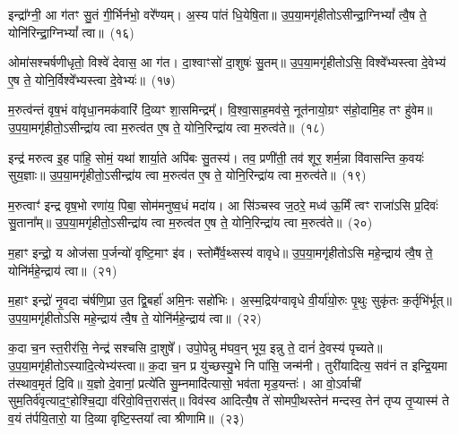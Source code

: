 {\anuvakamend[{मधु॑स्त्रि॒ꣳ॒शत्}]}%

इन्द्रा᳚ग्नी॒ आ ग॑तꣳ सु॒तं गी॒र्भिर्नभो॒ वरे᳚ण्यम्। अ॒स्य पा॑तं धि॒येषि॒ता॥ उ॒प॒या॒मगृ॑हीतो\-ऽसीन्द्रा॒ग्नि\-भ्यां᳚ त्वै॒ष ते॒ योनि॑रिन्द्रा॒ग्नि\-भ्यां᳚ त्वा॥~(१६)\ip

{\anuvakamend[{इन्द्रा᳚ग्नी विꣳश॒तिः}]}%

ओमा॑सश्चर्\mbox{}षणीधृतो॒ विश्वे॑ देवास॒ आ ग॑त। दा॒श्वाꣳसो॑ दा॒शुषः॑ सु॒तम्॥ उ॒प॒या॒मगृ॑हीतो\-ऽसि॒ विश्वे᳚भ्यस्त्वा दे॒वेभ्य॑ ए॒ष ते॒ योनि॒र्विश्वे᳚भ्यस्त्वा दे॒वेभ्यः॑॥~(१७)\ip

{\anuvakamend[{इन्द्रा᳚ग्नी॒ ओमा॑सो विꣳश॒तिर्विꣳ॑शतिः}]}%

म॒रुत्व॑न्तं वृष॒भं वा॑वृधा॒नमक॑वारिं दि॒व्यꣳ शा॒समिन्द्रम्᳚। वि॒श्वा॒साह॒मव॑से॒ नूत॑नायो॒ग्रꣳ स॑हो॒दामि॒ह तꣳ हु॑वेम॥ उ॒प॒या॒मगृ॑हीतो॒\-ऽसीन्द्रा॑य त्वा म॒रुत्व॑त ए॒ष ते॒ योनि॒रिन्द्रा॑य त्वा म॒रुत्व॑ते॥~(१८)\ip

{\anuvakamend[{म॒रुत्व॑न्त॒ꣳ॒ षड्विꣳ॑शतिः}]}%

इन्द्र॑ मरुत्व इ॒ह पा॑हि॒ सोमं॒ यथा॑ शार्या॒ते अपि॑बः सु॒तस्य॑। तव॒ प्रणी॑ती॒ तव॑ शूर॒ शर्म॒न्ना वि॑वासन्ति क॒वयः॑ सुय॒ज्ञाः॥ उ॒प॒या॒मगृ॑हीतो॒\-ऽसीन्द्रा॑य त्वा म॒रुत्व॑त ए॒ष ते॒ योनि॒रिन्द्रा॑य त्वा म॒रुत्व॑ते॥~(१९)\ip

{\anuvakamend[{इन्द्रैका॒न्नत्रि॒ꣳ॒शत्}]}%

म॒रुत्वाꣳ॑ इन्द्र वृष॒भो रणा॑य॒ पिबा॒ सोम॑मनुष्व॒धं मदा॑य। आ सि॑ञ्चस्व ज॒ठरे॒ मध्व॑ ऊ॒र्मिं त्वꣳ राजा॑\-ऽसि प्र॒दिवः॑ सु॒ताना᳚म्॥ उ॒प॒या॒मगृ॑हीतो॒\-ऽसीन्द्रा॑य त्वा म॒रुत्व॑त ए॒ष ते॒ योनि॒रिन्द्रा॑य त्वा म॒रुत्व॑ते॥~(२०)\ip

{\anuvakamend[{इन्द्र॑ मरुत्वो म॒रुत्वा॒नेका॒न्न त्रि॒ꣳ॒शदेका॒न्न त्रि॒ꣳ॒शत्}]}%

म॒हाꣳ इन्द्रो॒ य ओज॑सा प॒र्जन्यो॑ वृष्टि॒माꣳ इ॑व। स्तोमै᳚र्व॒थ्सस्य॑ वावृधे॥ उ॒प॒या॒मगृ॑हीतो\-ऽसि महे॒न्द्राय॑ त्वै॒ष ते॒ योनि॑र्महे॒न्द्राय॑ त्वा॥~(२१)\ip

{\anuvakamend[{म॒हानेका॒न्नविꣳ॑शतिः}]}%

म॒हाꣳ इन्द्रो॑ नृ॒वदा च॑र्\mbox{}षणि॒प्रा उ॒त द्वि॒बर्\mbox{}हा॑ अमि॒नः सहो॑भिः। अ॒स्म॒द्रिय॑ग्वावृधे वी॒र्या॑यो॒रुः पृ॒थुः सुकृ॑तः क॒र्तृभि॑र्भूत्॥ उ॒प॒या॒मगृ॑हीतो\-ऽसि महे॒न्द्राय॑ त्वै॒ष ते॒ योनि॑र्महे॒न्द्राय॑ त्वा॥~(२२)\ip

{\anuvakamend[{म॒हान्नृ॒वत्षड्विꣳ॑शतिः}]}%

क॒दा च॒न स्त॒रीर॑सि॒ नेन्द्र॑ सश्चसि दा॒शुषे᳚। उपो॒पेन्नु म॑घव॒न् भूय॒ इन्नु ते॒ दानं॑ दे॒वस्य॑ पृच्यते॥ उ॒प॒या॒मगृ॑हीतो\-ऽस्यादि॒त्येभ्य॑स्त्वा॥ क॒दा च॒न प्र यु॑च्छस्यु॒भे नि पा॑सि॒ जन्म॑नी। तुरी॑यादित्य॒ सव॑नं त इन्द्रि॒यमा त॑स्थाव॒मृतं॑ दि॒वि॥ य॒ज्ञो दे॒वानां॒ प्रत्ये॑ति सु॒म्नमादि॑त्यासो॒ भव॑ता मृड॒यन्तः॑। आ वो॒\-ऽर्वाची॑ सुम॒तिर्व॑वृत्याद॒ꣳ॒होश्चि॒द्या व॑रिवो॒वित्त॒रास॑त्॥ विव॑स्व आदित्यै॒ष ते॑ सोमपी॒थस्तेन॑ मन्दस्व॒ तेन॑ तृप्य तृ॒प्यास्म॑ ते व॒यं त॑र्पयि॒तारो॒ या दि॒व्या वृष्टि॒स्तया᳚ त्वा श्रीणामि॥~(२३)\ip

